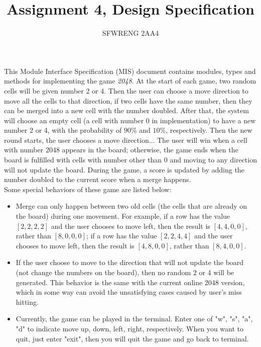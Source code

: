\documentclass[12pt]{article}
\title{Assignment 4, Design Specification}
\author{SFWRENG 2AA4}
\begin{document}
\maketitle
This Module Interface Specification (MIS) document contains modules, types and
methods for implementing the game \textit{2048}. At the start of each game, two random cells will be given number 2 or 4. Then the user can choose a move direction to move all the cells to that direction, if two cells have the same number, then they can be merged into a new cell with the number doubled. After that, the system will choose an empty cell (a cell with number 0 in implementation) to have a new number 2 or 4, with the probability of $90\%$ and $10\%$, respectively. Then the new round starts, the user chooses a move direction... The user will win when a cell with number 2048 appears in the board; otherwise, the game ends when the board is fulfilled with cells with number other than 0 and moving to any direction will not update the board. During the game, a score is updated by adding the number doubled to the current score when a merge happens.\\

Some special behaviors of these game are listed below:\\
\begin{itemize}
\item Merge can only happen between two old cells (the cells that are already on the board) during one movement. For example, if a row has the value $[2, 2, 2, 2]$ and the user chooses to move left, then the result is $[4, 4, 0, 0]$, rather than $[8, 0, 0, 0]$; if a row has the value $[2, 2, 4, 4]$ and the user chooses to move left, then the result is $[4, 8, 0, 0]$, rather than $[8, 4, 0, 0]$.
\item If the user choose to move to the direction that will not update the board (not change the numbers on the board), then no random 2 or 4 will be generated. This behavior is the same with the current online 2048 version, which in some way can avoid the unsatisfying cases caused by user's miss hitting.
\item Currently, the game can be played in the terminal. Enter one of "w", "s", "a", "d" to indicate move up, down, left, right, respectively. When you want to quit, just enter "exit", then you will quit the game and go back to terminal.
\end{itemize}
\end{document}
